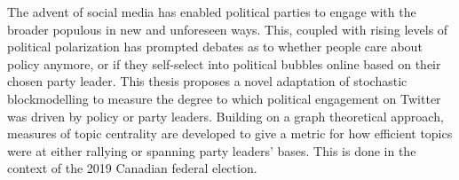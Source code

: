 The advent of social media has enabled political parties to engage with the
broader populous in new and unforeseen ways. This, coupled with rising levels of
political polarization has prompted debates as to whether people care about
policy anymore, or if they self-select into political bubbles online based on
their chosen party leader. This thesis proposes a novel adaptation of stochastic
blockmodelling to measure the degree to which political engagement on Twitter
was driven by policy or party leaders. Building on a graph theoretical approach,
measures of topic centrality are developed to give a metric for how efficient
topics were at either rallying or spanning party leaders' bases. This is done
in the context of the 2019 Canadian federal election.
